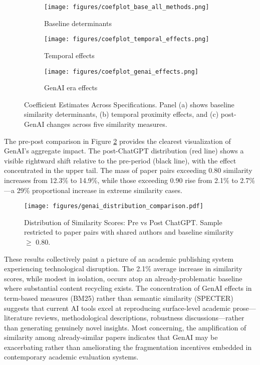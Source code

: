 \documentclass[12pt]{article}
\begin{document}
\begin{figure}[htbp]
\centering
\begin{subfigure}[b]{0.45\textwidth}
    \centering
    \texttt{[image: figures/coefplot\_base\_all\_methods.png]}
    \caption{Baseline determinants}
\end{subfigure}
\hfill
\begin{subfigure}[b]{0.45\textwidth}
    \centering
    \texttt{[image: figures/coefplot\_temporal\_effects.png]}
    \caption{Temporal effects}
\end{subfigure}

\vspace{0.5cm}

\begin{subfigure}[b]{0.45\textwidth}
    \centering
    \texttt{[image: figures/coefplot\_genai\_effects.png]}
    \caption{GenAI era effects}
\end{subfigure}
\caption{Coefficient Estimates Across Specifications. Panel (a) shows baseline similarity determinants, (b) temporal proximity effects, and (c) post-GenAI changes across five similarity measures.}
\label{fig:determinants}
\end{figure}

The pre-post comparison in Figure \ref{fig:pre_post_distribution} provides the clearest visualization of GenAI's aggregate impact. The post-ChatGPT distribution (red line) shows a visible rightward shift relative to the pre-period (black line), with the effect concentrated in the upper tail. The mass of paper pairs exceeding 0.80 similarity increases from 12.3\% to 14.9\%, while those exceeding 0.90 rise from 2.1\% to 2.7\%—a 29\% proportional increase in extreme similarity cases.

\begin{figure}[htbp]
\centering
\texttt{[image: figures/genai\_distribution\_comparison.pdf]}
\caption{Distribution of Similarity Scores: Pre vs Post ChatGPT. Sample restricted to paper pairs with shared authors and baseline similarity $\geq$ 0.80.}
\label{fig:pre_post_distribution}
\end{figure}

These results collectively paint a picture of an academic publishing system experiencing technological disruption. The 2.1\% average increase in similarity scores, while modest in isolation, occurs atop an already-problematic baseline where substantial content recycling exists. The concentration of GenAI effects in term-based measures (BM25) rather than semantic similarity (SPECTER) suggests that current AI tools excel at reproducing surface-level academic prose—literature reviews, methodological descriptions, robustness discussions—rather than generating genuinely novel insights. Most concerning, the amplification of similarity among already-similar papers indicates that GenAI may be exacerbating rather than ameliorating the fragmentation incentives embedded in contemporary academic evaluation systems.
\end{document}
